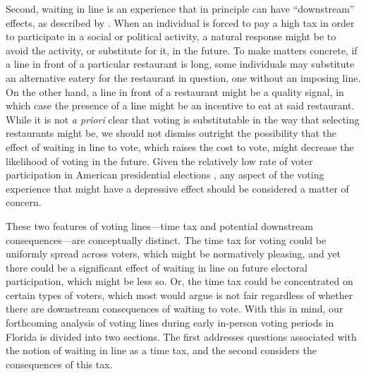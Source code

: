 \documentclass[12pt,titlepage]{article}
\begin{document}

Second, waiting in line is an experience that in principle can have
``downstream'' effects, as described by
\citet{pettigrew:longlinesminorityprecincts}. When an individual is
forced to pay a high tax in order to participate in a social or
political activity, a natural response might be to avoid the activity,
or substitute for it, in the future. To make matters concrete, if a
line in front of a particular restaurant is long, some individuals may
substitute an alternative eatery for the restaurant in question, one
without an imposing line.  On the other hand, a line in front of a
restaurant might be a quality signal, in which case the presence of a
line might be an incentive to eat at said restaurant.  While it is not
\emph{a priori} clear that voting is substitutable in the way that
selecting restaurants might be, we should not dismiss outright the possibility
that the effect of waiting in line to vote, which raises the cost to
vote, might decrease the likelihood of voting in the future.  Given
the relatively low rate of voter participation in American
presidential elections \citep{IDEA:turnout}, any aspect of the voting experience that might
have a depressive effect should be considered a matter of concern.


These two features of voting lines---time tax and potential downstream
consequences---are conceptually distinct. The time tax for voting
could be uniformly spread across voters, which might be normatively
pleasing, and yet there could be a significant effect of waiting in
line on future electoral participation, which might be less so. Or,
the time tax could be concentrated on certain types of voters, which
most would argue is not fair regardless of whether there are
downstream consequences of waiting to vote. With this in mind, our
forthcoming analysis of voting lines during early in-person voting periods in Florida is divided into
two sections. The first addresses questions associated with the notion
of waiting in line as a time tax, and the second considers the
consequences of this tax.
\end{document}
